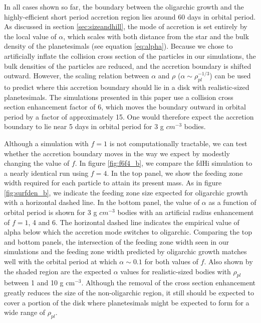 \documentclass[twocolumn]{aastex63}
\begin{document}
In all cases shown so far, the boundary between the
oligarchic growth and the highly-efficient short period accretion
region lies around 60 days in orbital period. As discussed in section \ref{sec:sizeandhill}, the mode of accretion is
set entirely by the local value of $\alpha$, which scales with both
distance from the star and the bulk density of the planetesimals (see
equation \ref{eq:alpha}). Because we chose to artificially inflate the
collision cross section of the particles in our simulations, the bulk densities
of the particles are reduced, and the accretion boundary is shifted outward.
However,  the scaling relation between $\alpha$ and $\rho$ ($\alpha \sim \rho_{pl}^{-1/3}$) can be used
to predict where this accretion boundary should lie in a disk with realistic-sized planetesimals. The simulations
presented in this paper use a collision cross section enhancement factor of 6, which moves the boundary outward in orbital
period by a factor of approximately 15. One would therefore expect the accretion boundary to lie near 5 days in orbital period
for 3 g $cm^{-3}$ bodies.

Although a simulation with $f=1$ is not computationally tractable, we
can test whether the accretion boundary moves in the way we expect by
modestly changing the value of $f$. In figure \ref{fig:f6f4_b}, we
compare the fdHi simulation to a nearly identical run using $f=4$. In
the top panel, we show the feeding zone width required for each particle to
attain its present mass. As in figure \ref{fig:surfden_b}, we indicate the feeding
zone size expected for oligarchic growth with a horizontal dashed line. In the bottom panel, the value
of $\alpha$ as a function of orbital period is shown for 3 g $cm^{-3}$
bodies with an artificial radius enhancement of $f=1$, 4 and 6. The
horizontal dashed line indicates the empirical value of alpha below which the
accretion mode switches to oligarchic. Comparing the top and
bottom panels, the intersection of the feeding zone width seen in our simulations and the
feeding zone width predicted by oligarchic growth matches well with the orbital period at which $\alpha
\sim 0.1$ for both values of $f$.  Also shown by the shaded region are the expected $\alpha$ values for
realistic-sized bodies with $\rho_{pl}$ between 1 and 10 g cm$^{-3}$. Although the removal of the cross section
enhancement greatly reduces the size of the non-oligarchic region, it still should be expected to cover a portion of the
disk where planetesimals might be expected to form for a wide range of $\rho_{pl}$.
\end{document}
